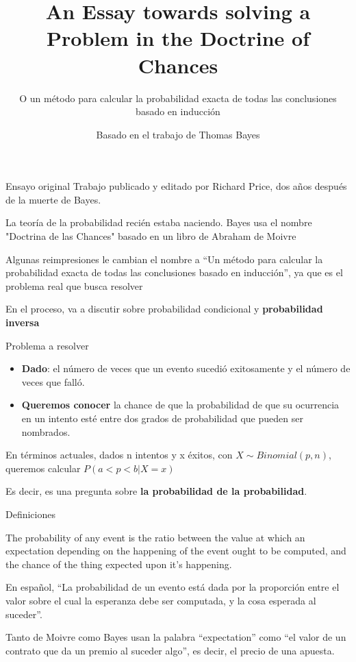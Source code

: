 \documentclass{beamer}
\title{An Essay towards solving a Problem in the Doctrine of Chances}
\subtitle{O un método para calcular la probabilidad exacta de todas las conclusiones basado en inducción}
\author{Basado en el trabajo de Thomas Bayes}
\begin{document}
\begin{frame}[plain]
    \maketitle
\end{frame}

\begin{frame}{Ensayo original}
	Trabajo publicado y editado por Richard Price, dos años después de la muerte de Bayes.

	La teoría de la probabilidad recién estaba naciendo.
	Bayes usa el nombre "Doctrina de las Chances" basado en un libro de Abraham de Moivre

	Algunas reimpresiones le cambian el nombre a ``Un método para calcular la probabilidad exacta de todas las conclusiones basado en inducción'', ya que es el problema real que busca resolver

	En el proceso, va a discutir sobre probabilidad condicional y \textbf{probabilidad inversa}
\end{frame}

\begin{frame}{Problema a resolver}
	\begin{itemize}
		\item \textbf{Dado}: el número de veces que un evento sucedió exitosamente y el número de veces que falló.
		\item \textbf{Queremos conocer} la chance de que la probabilidad de que su ocurrencia en un intento esté entre dos grados de probabilidad que pueden ser nombrados.
	\end{itemize}

	En términos actuales,
	dados n intentos y x éxitos, con $X \sim Binomial(p, n)$,
	queremos calcular $P(a < p < b | X = x)$

	Es decir, es una pregunta sobre \textbf{la probabilidad de la probabilidad}.
\end{frame}

\begin{frame}{Definiciones}
	\begin{displayquote}
		The probability of any event is the ratio between the value at which an expectation depending on the happening of the event ought to be computed, and the chance of the thing expected upon it’s happening.  
	\end{displayquote}

	En español, ``La probabilidad de un evento está dada por la proporción entre el valor sobre el cual la esperanza debe ser computada, y la cosa esperada al suceder''.

	Tanto de Moivre como Bayes usan la palabra ``expectation'' como ``el valor de un contrato que da un premio al suceder algo'', es decir, el precio de una apuesta.
\end{frame}
\end{document}
